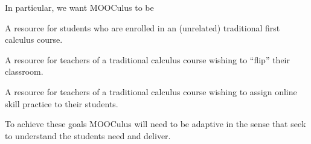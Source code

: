  In particular, we want
MOOCulus to be

A resource for students who are enrolled in an (unrelated) traditional first
calculus course.

A resource for teachers of a traditional calculus course wishing to ``flip''
their classroom.

A resource for teachers of a traditional calculus course wishing to assign
online skill practice to their students.

To achieve these goals MOOCulus will need to be adaptive in the sense that
seek to understand the students need and deliver.













